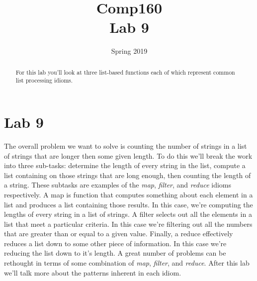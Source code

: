 \documentclass[nobib]{tufte-handout}
\title{Comp160 \\ Lab 9 }
\author{}
\date{ Spring 2019 }
\begin{document}
\maketitle

\begin{abstract}
For this lab you'll look at three list-based functions each of which represent common list processing idioms.
\end{abstract}

\section*{Lab 9}

The overall problem we want to solve is counting the number of strings in a list of strings that are longer then some given length. To do this we'll break the work
into three sub-tasks: determine the length of every string in the list, compute a list containing on those strings that are long enough, then counting the length
of a string.  These subtasks are examples of the \textit{map}, \textit{filter}, and \textit{reduce} idioms respectively. A map is function that computes something about each element in a list and produces a list containing those results. In this case, we're computing the lengths of every string in a list of strings. A filter selects out all the elements in a list that meet a particular criteria. In this case we're filtering out all the numbers that are greater than or equal to a given value. Finally, a reduce effectively reduces a list down to some other piece of information.  In this case we're reducing the list down to it's length.  A great number of problems can be rethought in terms of some combination of \textit{map}, \textit{filter}, and \textit{reduce}. After this lab we'll talk more about the patterns inherent in each idiom.
\end{document}
